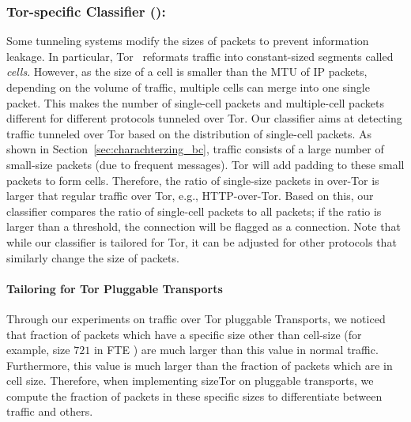 \subsubsection{Tor-specific Classifier ():}

Some tunneling systems modify the sizes of packets to prevent information leakage. In particular, Tor~\cite{tor}
reformats traffic into constant-sized segments called  \emph{cells}. However, as the size of a cell is smaller than the MTU of IP packets, depending on the volume of traffic, multiple cells can merge into one single packet. This makes the number of single-cell packets and multiple-cell packets different for different protocols tunneled over Tor. Our  classifier aims at detecting \bc traffic tunneled over Tor based on the distribution of single-cell packets. 
As shown in Section~\ref{sec:charachterzing_bc}, \bc traffic consists of a large number of small-size packets (due to frequent  messages). Tor will add padding to these small packets to form cells. Therefore, the ratio of single-size packets in \bc over-Tor is larger that regular traffic over Tor, e.g., HTTP-over-Tor. Based on this, our classifier compares the ratio of single-cell packets to all packets; if the ratio is larger than a threshold, the connection will be flagged as a \bc connection. 
Note that while our  classifier is tailored for Tor, it can be adjusted for other protocols that similarly change the size of packets.
\paragraph*{Tailoring for Tor Pluggable Transports}
 Through our experiments on \bc traffic over Tor pluggable Transports, we noticed that fraction of packets which have a specific size other than cell-size (for example, size $721$ in FTE ) are much larger than this value in normal traffic. Furthermore, this value is much larger than the fraction of packets which are in cell size. Therefore, when implementing sizeTor on pluggable transports, we compute the fraction of packets in these specific sizes to differentiate between \bc traffic and others.



